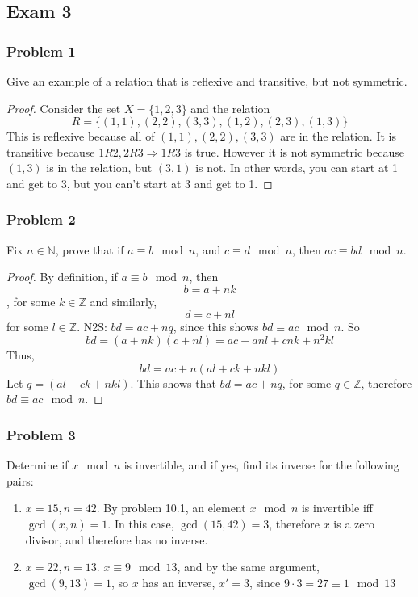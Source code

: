 \documentclass[hidelinks,12pt]{article}
\newcommand{\N}{\mathbb{N}}
\newcommand{\Z}{\mathbb{Z}}
\begin{document}
\subsection{Exam 3}
\subsubsection{Problem 1}
Give an example of a relation that is reflexive and transitive, but not symmetric.
\begin{proof}
  Consider the set $X=\{1,2,3\}$ and the relation \[R=\{(1,1),(2,2),(3,3),(1,2),(2,3),(1,3)\}\] This is reflexive because all of $(1,1),(2,2),(3,3)$ are in the relation. It is transitive because $1R2,2R3\Longrightarrow1R3$ is true. However it is not symmetric because $(1,3)$ is in the relation, but $(3,1)$ is not. In other words, you can start at 1 and get to 3, but you can't start at 3 and get to 1.
\end{proof}
\subsubsection{Problem 2}
Fix $n\in\N$, prove that if $a\equiv b\mod{n}$, and $c\equiv d\mod{n}$, then $ac\equiv bd\mod{n}$.
\begin{proof}
By definition, if $a\equiv b\mod{n}$, then $$b=a+nk$$, for some $k\in\Z$ and similarly, $$d=c+nl$$ for some $l\in\Z$. \newline N2S: $bd=ac+nq$, since this shows $bd\equiv ac\mod{n}$. So $$bd=(a+nk)(c+nl)=ac+anl+cnk+n^2kl$$ Thus, $$bd=ac+n(al+ck+nkl)$$ Let $q=(al+ck+nkl)$. This shows that $bd=ac+nq$, for some $q\in\Z$, therefore $bd\equiv ac\mod{n}$.
\end{proof}
\subsubsection{Problem 3}
Determine if $x\mod{n}$ is invertible, and if yes, find its inverse for the following pairs:
\begin{enumerate}
    \item $x=15, n=42$. By problem 10.1, an element $x\mod{n}$ is invertible iff $\gcd(x,n)=1$. In this case, $\gcd(15,42)=3$, therefore $x$ is a zero divisor, and therefore has no inverse.
    \item $x=22, n=13$. $x\equiv9\mod{13}$, and by the same argument,\\ $\gcd(9,13)=1$, so $x$ has an inverse, $x'=3$, since $9\cdot3=27\equiv1\mod{13}$
\end{enumerate}
\end{document}
